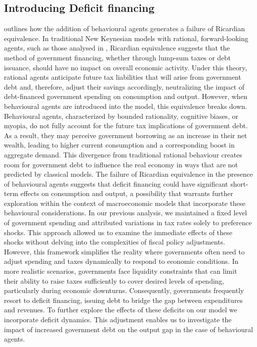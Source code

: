 \documentclass[11pt]{article}
\newcommand{\bb}{\bigbreak\noindent}
\begin{document}
\begin{spacing}{2}
\section{Introducing Deficit financing}
\cite{gabaix2020behavioural} outlines how the addition of behavioural agents generates a failure of Ricardian equivalence. In traditional New Keynesian models with rational, forward-looking agents, such as those analysed in \cite{eggertsson2011fiscal}, Ricardian equivalence suggests that the method of government financing, whether through lump-sum taxes or debt issuance, should have no impact on overall economic activity. Under this theory, rational agents anticipate future tax liabilities that will arise from government debt and, therefore, adjust their savings accordingly, neutralizing the impact of debt-financed government spending on consumption and output.
\bb
However, when behavioural agents are introduced into the model, this equivalence breaks down. Behavioural agents, characterized by bounded rationality, cognitive biases, or myopia, do not fully account for the future tax implications of government debt. As a result, they may perceive government borrowing as an increase in their net wealth, leading to higher current consumption and a corresponding boost in aggregate demand. This divergence from traditional rational behaviour creates room for government debt to influence the real economy in ways that are not predicted by classical models. The failure of Ricardian equivalence in the presence of behavioural agents suggests that deficit financing could have significant short-term effects on consumption and output, a possibility that warrants further exploration within the context of macroeconomic models that incorporate these behavioural considerations.
\bb
In our previous analysis, we maintained a fixed level of government spending and attributed variations in tax rates solely to preference shocks. This approach allowed us to examine the immediate effects of these shocks without delving into the complexities of fiscal policy adjustments. However, this framework simplifies the reality where governments often need to adjust spending and taxes dynamically to respond to economic conditions. In more realistic scenarios, governments face liquidity constraints that can limit their ability to raise taxes sufficiently to cover desired levels of spending, particularly during economic downturns. Consequently, governments frequently resort to deficit financing, issuing debt to bridge the gap between expenditures and revenues. To further explore the effects of these deficits on our model we incorporate deficit dynamics. This adjustment enables us to investigate the impact of increased government debt on the output gap in the case of behavioural agents.

\end{spacing}
\end{document}

